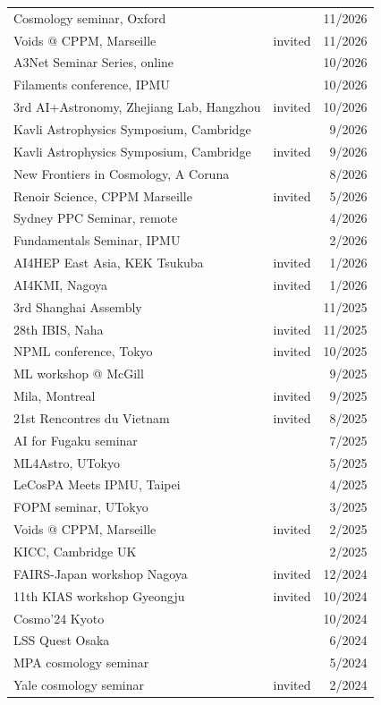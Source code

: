 \begin{longtable}{lcr}
Cosmology seminar, Oxford && 11/2026 \\
Voids @ CPPM, Marseille & invited & 11/2026 \\
A3Net Seminar Series, online && 10/2026 \\
Filaments conference, IPMU && 10/2026 \\
3rd AI+Astronomy, Zhejiang Lab, Hangzhou & invited & 10/2026 \\
Kavli Astrophysics Symposium, Cambridge && 9/2026 \\
Kavli Astrophysics Symposium, Cambridge & invited & 9/2026 \\
New Frontiers in Cosmology, A Coruna && 8/2026 \\
Renoir Science, CPPM Marseille & invited & 5/2026 \\
Sydney PPC Seminar, remote && 4/2026 \\
Fundamentals Seminar, IPMU && 2/2026 \\
AI4HEP East Asia, KEK Tsukuba & invited & 1/2026 \\
AI4KMI, Nagoya & invited & 1/2026 \\
3rd Shanghai Assembly && 11/2025 \\
28th IBIS, Naha & invited & 11/2025 \\
NPML conference, Tokyo & invited & 10/2025 \\
ML workshop @ McGill && 9/2025 \\
Mila, Montreal & invited & 9/2025 \\
21st Rencontres du Vietnam & invited & 8/2025 \\
AI for Fugaku seminar && 7/2025 \\
ML4Astro, UTokyo && 5/2025 \\
LeCosPA Meets IPMU, Taipei && 4/2025 \\
FOPM seminar, UTokyo && 3/2025 \\
Voids @ CPPM, Marseille & invited & 2/2025 \\
KICC, Cambridge UK && 2/2025 \\
FAIRS-Japan workshop Nagoya & invited & 12/2024 \\
11th KIAS workshop Gyeongju & invited & 10/2024 \\
Cosmo'24 Kyoto && 10/2024 \\
LSS Quest Osaka && 6/2024 \\
MPA cosmology seminar && 5/2024 \\
Yale cosmology seminar & invited & 2/2024 \\

\end{longtable}
